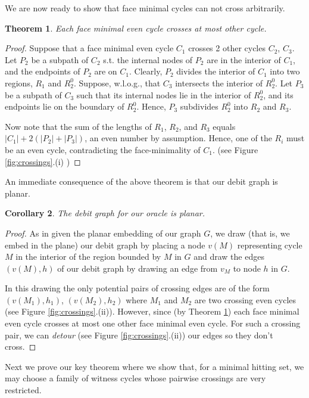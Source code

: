 \documentclass[letterpaper,11pt]{article}
\newtheorem{theorem}{Theorem}[section]
\newtheorem{cor}[theorem]{Corollary}
\newcommand{\0}{\mathbb{0}}
\newcommand{\1}{\mathbb{1}}
\begin{document}
We are now ready to show that face minimal cycles can not cross
arbitrarily. 

\begin{theorem}\label{1cross}
Each face minimal even cycle crosses at most  other  cycle.
\end{theorem}
\begin{proof}
Suppose that a face minimal even cycle $C_1$ crosses 2 other  cycles $C_2$, $C_3$.
Let $P_2$ be a subpath of $C_2$ s.t. the internal nodes of $P_2$ are in the interior of $C_1$, and the endpoints of $P_2$ are on $C_1$. Clearly, $P_2$ divides the interior of $C_1$ into two regions, $R_1$ and $R^0_2$. Suppose, w.l.o.g., that $C_3$ intersects the interior of $R^0_2$. Let $P_3$ be a subpath of $C_3$ such that its internal nodes lie in the interior of $R^0_2$, and its endpoints lie on the boundary of $R^0_2$. Hence, $P_3$ subdivides $R^0_2$ into $R_2$ and $R_3$.

Now note that the sum of the lengths of $R_1$, $R_2$, and $R_3$ equals $|C_1| +2(|P_2|+|P_3|)$, an even number by assumption. Hence, one of the $R_i$ must be an even cycle, contradicting the face-minimality of $C_1$. (see Figure \ref{fig:crossings}.(i) )
\end{proof}

An immediate consequence of the above theorem is that our debit graph
is planar. 

\begin{cor}
The debit graph for our oracle is planar.
\end{cor}
\begin{proof}
As in \cite{GW98} given the planar embedding of our graph $G$,  we draw (that is, we embed in the plane) our  debit graph  by placing a  node  $v(M)$ representing cycle $M$  in the interior of the region bounded by $M$  in $G$   and draw the edges $(v(M),h) $  of our debit graph by drawing an edge from  $v_M$ to node $h$  in $G$. 

In this drawing the only potential pairs of crossing edges are of the
form $ (v(M_1),h_1)$, $(v(M_2),h_2)$ where $M_1$ and $M_2$ are two
crossing even cycles (see Figure \ref{fig:crossings}.(ii)). However, since (by
Theorem \ref{1cross}) each face minimal even cycle crosses at most one
other face minimal even cycle. For such a crossing pair, we can {\em
  detour} (see Figure \ref{fig:crossings}.(ii)) our edges so they don't cross.
\end{proof}

Next we prove our key theorem where we show that, for a minimal hitting set, we may choose a family of witness cycles whose pairwise crossings are very restricted.  
\end{document}
